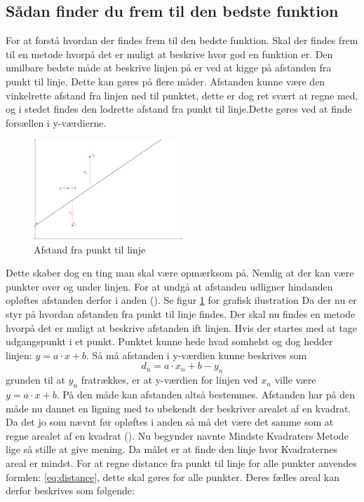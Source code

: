 \subsection{Sådan finder du frem til den bedste funktion}
For at forstå hvordan der findes frem til den bedste funktion. Skal der findes frem til en metode hvorpå det er muligt at beskrive hvor god en funktion er.
Den umilbare bedste måde at beskrive linjen på er ved at kigge på afstanden fra punkt til linje. Dette kan gøres på flere måder. Afstanden kunne være den vinkelrette afstand fra linjen ned til punktet, dette er dog ret svært at regne med, og i stedet findes den lodrette afstand fra punkt til linje.Dette gøres ved at finde forsællen i y-værdierne.
\begin{figure}
    \centering
    \includegraphics[width=0.5\textwidth]{figures/afstand.png}
    \caption{Afstand fra punkt til linje}
    \label{fig:afstandFraLinjeTilPunkt}
\end{figure}   
Dette skaber dog en ting man skal være opmærksom på. Nemlig at der kan være punkter over og under linjen. For at undgå at afstanden udligner hindanden opløftes afstanden derfor i anden 
(\cite[2]{ForberedelsessetMaj2013}). Se figur \ref{fig:afstandFraLinjeTilPunkt} for grafisk ilustration 
Da der nu er styr på hvordan afstanden fra punkt til linje findes. Der skal nu findes en metode hvorpå det er muligt at beskrive afstanden ift linjen. Hvis der startes med at tage udgangspunkt i et punkt. Punktet kunne hede hvad somhelst og dog hedder linjen: $y = a \cdot x + b$. Så må afstanden i y-værdien kunne beskrives som \begin{equation}\label{eq:distance}
    d_n = a \cdot x_n + b - y_n
\end{equation} grunden til at $y_n$ fratrækkes, er at y-værdien for linjen ved $x_n$ ville være $y =a \cdot x + b$. På den måde kan afstanden altså bestemmes. Afstanden har på den måde nu dannet en ligning med to ubekendt der beskriver arealet af en kvadrat. Da det jo som nævnt før opløftes i anden så må det være det samme som at regne arealet af en kvadrat (\cite{Bentzen2014}). Nu begynder navnte Mindste Kvadraters Metode lige så stille at give mening. Da målet er at finde den linje hvor Kvadraternes areal er mindst. For at regne distance fra punkt til linje for alle punkter anvendes formlen: \ref{eq:distance}, dette skal gøres for alle punkter. Deres fælles areal kan derfor beskrives som følgende:
